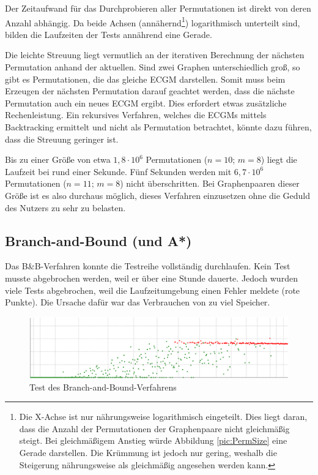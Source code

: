 Der Zeitaufwand für das Durchprobieren aller Permutationen ist direkt von deren Anzahl 
abhängig. Da beide Achsen (annähernd\footnote{Die X-Achse ist nur nährungsweise logarithmisch 
eingeteilt. Dies liegt daran, dass die Anzahl der Permutationen der Graphenpaare nicht 
gleichmäßig steigt. Bei gleichmäßigem Anstieg würde Abbildung \ref{pic:PermSize} eine Gerade 
darstellen. Die Krümmung ist jedoch nur gering, weshalb die Steigerung nährungsweise als 
gleichmäßig angesehen werden kann.}) logarithmisch unterteilt sind, bilden die 
Laufzeiten der Tests annährend eine Gerade.

Die leichte Streuung liegt vermutlich an 
der iterativen Berechnung der nächsten Permutation anhand der aktuellen. Sind zwei 
Graphen unterschiedlich groß, so gibt es Permutationen, die das gleiche ECGM darstellen. 
Somit muss beim Erzeugen der nächsten Permutation darauf geachtet werden, dass die 
nächste Permutation auch ein neues ECGM ergibt. Dies erfordert etwas zusätzliche Rechenleistung. 
Ein rekursives Verfahren, welches die ECGMs mittels Backtracking ermittelt und nicht als 
Permutation betrachtet, könnte dazu führen, dass die Streuung geringer ist. 

Bis zu einer Größe von etwa $1{,}8 \cdot 10^6$ Permutationen ($n=10$; $m=8$) liegt die 
Laufzeit bei rund einer Sekunde. Fünf Sekunden werden mit $6{,}7 \cdot 10^6$ Permutationen 
($n=11$; $m=8$) nicht überschritten. Bei Graphenpaaren dieser Größe ist es also durchaus 
möglich, dieses Verfahren einzusetzen ohne die Geduld des Nutzers zu sehr zu belasten. 

\subsection{Branch-and-Bound (und A*)}\label{BBTest}
Das B\&B-Verfahren konnte die Testreihe vollständig durchlaufen. Kein Test musste 
abgebrochen werden, weil er über eine Stunde dauerte. Jedoch wurden viele Tests 
abgebrochen, weil die Laufzeitumgebung einen Fehler meldete (rote Punkte). Die Ursache 
dafür war das Verbrauchen von zu viel Speicher. 

\begin{figure}[htb]
\centering
\noindent\includegraphics[width=\linewidth,height=\textheight,
keepaspectratio]{bilder/B&B}
\caption{Test des Branch-and-Bound-Verfahrens}
\label{pic:B&B}
\end{figure}

